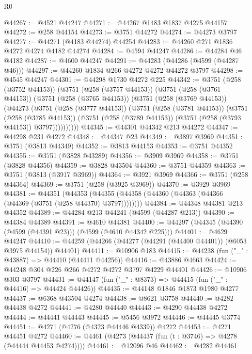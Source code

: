 \begin{lexlean}{R0}
\begin{coremodule}
@44267 := @4521 @44247
@44271 := @44267 @1483 @1837 @4275 @44157
@44272 := @258 @44154
@44273 := @3751 @44272
@44274 := @44273 @3797
@44277 := @44271 (@4183 @44274) @44254
@44283 := @44260 @271 @1836 @4272 @4274 @4182 @44274
@44284 := @4594 @44247
@44286 := @44284 @46 @4182
@44287 := @4600 @44247
@44291 := @44283 (@44286 (@4599 (@44287 @46)))
@44297 := @44260 @1834 @266 @4272 @4272 @44272 @3797
@44298 := @4545 @44247
@44301 := @44298 @1730 @4272 @225
@44342 := @3751
    (@258 (@3752 @44153))
    (@3751
      (@258 (@3757 @44153))
      (@3751
        (@258 (@3761 @44153))
        (@3751
          (@258 (@3765 @44153))
          (@3751
            (@258 (@3769 @44153))
            (@44273
              (@3751
                (@258 (@3777 @44153))
                (@3751
                  (@258 (@3781 @44153))
                  (@3751
                    (@258 (@3785 @44153))
                    (@3751 (@258 (@3789 @44153)) (@3751 (@258 (@3793 @44153)) @3797))))))))))
@44345 := @44301 @44342 @213 @44272
@44347 := @44298 @231 @4272
@44348 := @44347 @23
@44349 := @3897 @3969
@44351 := @3751 (@3813 @44349)
@44352 := @3813 @44153
@44353 := @3751 @44352
@44355 := @3751 (@3828 @43289)
@44356 := @3909 @3969
@44358 := @3751 (@3828 @44356)
@44359 := @3828 @43504
@44360 := @3751 @44359
@44363 := @3751 (@3813 (@3917 @3969))
@44364 := @3921 @3969
@44366 := @3751 (@258 @44364)
@44369 := @3751 (@258 (@3925 @3969))
@44370 := @3929 @3969
@44381 := @44351
    (@44353 (@44355 (@44358 (@44360 (@44363 (@44366 (@44369 (@3751 (@258 @44370) @3797))))))))
@44384 := @44348 @44381 @213 @44352
@44389 := @44284 @213 @44241 (@4599 (@44287 @213))
@44390 := @44384 @44389
@44391 := @4610 @44381
@44400 := @44297 (@44345 (@44390 (@4599 (@44391 @23))) (@4599 (@4610 @44342 @225)))
@44401 := @4629 @44247
@44410 := @44259 (@44266 (@44277 (@44291 (@44400 @44401)) (@6053 @3975 @44154)) @44401)
@44411 := @10906 @183
@44415 := @44238 (fun ("_" : @43887) => @44410 (@44411 @44256))
@44416 := @43886 @4663
@44424 := @44248 @304 @226 @266 @4272 @4272 @3797 @4229 @44401
@44426 := @10906 @303 @3797
@44431 := @44147 (fun ("_" : @8373) => @44415 (fun ("_" : @44416) => @44424 @44426))
@44435 := @44148 @1846 @1873 @1980 @4277
@44437 := @6368 @43504 @4274
@44438 := @8621 @3758
@44440 := @4282 @44438 @4272
@44441 := @4280 @44440
@44443 := @4290 @44438 @4272
@44444 := @44441 @44443
@44445 := @5456 @3972
@44446 := @44445 @3774
@44451 := @4271 (@4276 (@4323 @44446 @4339)) @4272
@44453 := @4271 @44451 @4272
@44460 := @4461 (@4273 (@44437 (fun (t : @3746) => @4278 (@44444 @44453 @4274))))
@44461 := @12096 @46
@44462 := @4282 @44461

\end{coremodule}
\end{lexlean}
